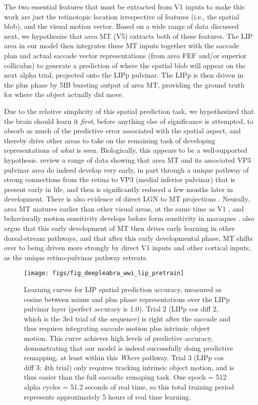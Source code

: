 \documentclass[11pt,twoside]{article}
\newif\myifpdf
\begin{document}
The two essential features that must be extracted from V1 inputs to make this work are just the retinotopic location irrespective of features (i.e., the spatial blob), and the visual motion vector.  Based on a wide range of data discussed next, we hypothesize that area MT (V5) extracts both of these features.  The LIP area in our model then integrates these MT inputs together with the saccade plan and actual saccade vector representations (from area FEF and/or superior colliculus) to generate a prediction of where the spatial blob will appear on the next alpha trial, projected onto the LIPp pulvinar.  The LIPp is then driven in the plus phase by 5IB bursting output of area MT, providing the ground truth for where the object actually did move.

Due to the relative simplicity of this spatial prediction task, we hypothesized that the brain should learn it {\em first}, before anything else of significance is attempted, to absorb as much of the predictive error associated with the spatial aspect, and thereby drive other areas to take on the remaining task of developing representations of {\em what} is seen.  Biologically, this appears to be a well-supported hypothesis.   review a range of data showing that area MT and its associated VP3 pulvinar area do indeed develop very early, in part through a unique pathway of strong connections from the retina to VP3 (medial inferior pulvinar) that is present early in life, and then is significantly reduced a few months later in development. There is also evidence of direct LGN to MT projections \cite{SincichParkWohlgemuthEtAl04}.  Neurally, area MT matures earlier than other visual areas, at the same time as V1 \cite{BourneRosa06}, and behaviorally motion sensitivity develops before form sensitivity in macaques \cite{KiorpesPriceHall-HaroEtAl12}.   also argue that this early development of MT then drives early learning in other dorsal-stream pathways, and that after this early developmental phase, MT shifts over to being driven more strongly by direct V1 inputs and other cortical inputs, as the unique retino-pulvinar pathway retreats.

\begin{figure}
  \centering\texttt{[image: figs/fig\_deepleabra\_wwi\_lip\_pretrain]}
  \caption{\footnotesize Learning curves for LIP spatial prediction accuracy, measured as cosine between minus and plus phase representations over the LIPp pulvinar layer (perfect accuracy is 1.0).  Trial 2 (LIPp cos diff 2, which is the 3rd trial of the sequence) is right after the saccade and thus requires integrating saccade motion plus intrinsic object motion.  This curve achieves high levels of predictive accuracy, demonstrating that our model is indeed successfully doing predictive remapping, at least within this {\em Where} pathway.  Trial 3 (LIPp cos diff 3; 4th trial) only requires tracking intrinsic object motion, and is thus easier than the full saccadic remaping task.  One epoch = 512 alpha cycles = 51.2 seconds of real time, so this total training period represents approximately 5 hours of real time learning. }
  \label{fig.lip_pretrain}
\end{figure}
\end{document}

